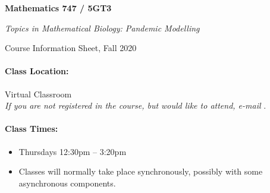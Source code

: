 \documentclass[12pt]{article}
\begin{document}

{\Large\parindent=0pt

{\bfseries Mathematics 747 / 5GT3}

{\slshape Topics in Mathematical Biology: Pandemic Modelling}

Course Information Sheet, Fall 2020

}

\bigskip



\paragraph*{Class Location:} Virtual Classroom\\
\emph{If you are not registered in the course, but would like to
  attend, e-mail} \texttt{\myemaillink}.

\paragraph*{Class Times:}
\begin{itemize}%
\item Thursdays 12:30pm -- 3:20pm
\item Classes will normally take place synchronously, possibly with some asynchronous components.
\end{itemize}
\end{document}
